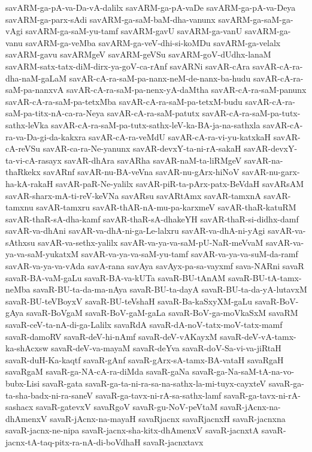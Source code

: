 {savARM-ga-pA-va-Da-vA-dalilx
savARM-ga-pA-vaDe
savARM-ga-pA-va-Deya
savARM-ga-parx-sAdi
savARM-ga-saM-baM-dha-vanunx
savARM-ga-saM-ga-vAgi
savARM-ga-saM-yu-tamf
savARM-gavU
savARM-ga-vanU
savARM-ga-vanu
savARM-ga-veMba
savARM-ga-veV-dhi-si-koMDu
savARM-ga-velalx
savARM-gavu
savARMgeV
savARM-geVSu
savARM-goV-dUdhx-lanaM
savARM-satx-tatx-diM-dirx-ya-goV-ca-rAnf
savARNi
savAR-cAra
savAR-cA-ra-dha-naM-gaLaM
savAR-cA-ra-saM-pa-nanx-neM-de-nanx-ba-hudu
savAR-cA-ra-saM-pa-nanxvA
savAR-cA-ra-saM-pa-nenx-yA-daMtha
savAR-cA-ra-saM-panunx
savAR-cA-ra-saM-pa-tetxMba
savAR-cA-ra-saM-pa-tetxM-budu
savAR-cA-ra-saM-pa-titx-nA-ca-ra-Neya
savAR-cA-ra-saM-patutx
savAR-cA-ra-saM-pa-tutx-sathx-leVka
savAR-cA-ra-saM-pa-tutx-sathx-leV-ka-BA-ja-na-sathxla
savAR-cA-ra-va-Da-gi-da-kakxra
savAR-cA-ra-veMdU
savAR-cA-ra-vi-yu-katxkaH
savAR-cA-reVSu
savAR-ca-ra-Ne-yanunx
savAR-devxY-ta-ni-rA-sakaH
savAR-devxY-ta-vi-cA-rasayx
savAR-dhAra
savARha
savAR-naM-ta-liRMgeV
savAR-na-thaRkekx
savARnf
savAR-nu-BA-veVna
savAR-nu-gArx-hiNoV
savAR-nu-garx-ha-kA-rakaH
savAR-paR-Ne-yalilx
savAR-piR-ta-pArx-patx-BeVdaH
savARsAM
savAR-sharx-mA-ti-reV-keVNa
savARsu
savARtAmx
savAR-tamxnA
savAR-tamxnu
savAR-tamxru
savAR-thAR-nA-mu-pa-karxmeV
savAR-thaR-katuRM
savAR-thaR-sA-dha-kamf
savAR-thaR-sA-dhakeYH
savAR-thaR-si-didhx-damf
savAR-va-dhAni
savAR-va-dhA-ni-ga-Le-lalxru
savAR-va-dhA-ni-yAgi
savAR-va-sAthxsu
savAR-va-sethx-yalilx
savAR-va-ya-va-saM-pU-NaR-meVvaM
savAR-va-ya-va-saM-yukatxM
savAR-va-ya-va-saM-yu-tamf
savAR-va-ya-va-suM-da-ramf
savAR-va-ya-va-vAda
savA-rana
savAya
savAyx-pa-sa-vayxmf
sava-NARni
savaR
savaR-BA-vaM-gaLu
savaR-BA-va-kUTa
savaR-BU-tAnAM
savaR-BU-tA-tamx-neMba
savaR-BU-ta-da-ma-nAya
savaR-BU-ta-dayA
savaR-BU-ta-da-yA-lutavxM
savaR-BU-teVBoyxV
savaR-BU-teVshaH
savaR-Ba-kaSxyXM-gaLu
savaR-BoV-gAya
savaR-BoVgaM
savaR-BoV-gaM-gaLa
savaR-BoV-ga-moVkaSxM
savaRM
savaR-ceV-ta-nA-di-ga-Lalilx
savaRdA
savaR-dA-noV-tatx-moV-tatx-mamf
savaR-damoRV
savaR-deV-hi-nAmf
savaR-deV-vAKayxM
savaR-deV-vA-tamx-ka-shAcxsw
savaR-deV-va-mayaM
savaR-deYva
savaR-doV-Sa-vi-va-jiRtaH
savaR-duH-Ka-kaqtf
savaR-gAnf
savaR-gArx-sA-tamx-BA-vataH
savaRgaH
savaRgaM
savaR-ga-NA-cA-ra-diMda
savaR-gaNa
savaR-ga-Na-saM-tA-na-vo-bubx-Lisi
savaR-gata
savaR-ga-ta-ni-ra-sa-na-sathx-la-mi-tuyx-cayxteV
savaR-ga-ta-sha-badx-ni-ra-saneV
savaR-ga-tavx-ni-rA-sa-sathx-lamf
savaR-ga-tavx-ni-rA-sashacx
savaR-gatevxV
savaRgoV
savaR-gu-NoV-peVtaM
savaR-jAcnx-na-dhAmenxV
savaR-jAcnx-na-mayaH
savaRjacnx
savaRjacnxH
savaR-jacnxna
savaR-jacnx-ne-nipa
savaR-jacnx-sha-kitx-dhAmenxV
savaR-jacnxtA
savaR-jacnx-tA-taq-pitx-ra-nA-di-boVdhaH
savaR-jacnxtavx
}
